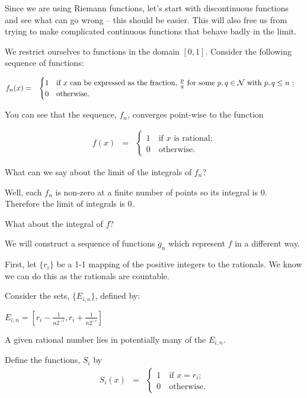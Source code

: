 \documentclass{article}
\begin{document}
Since we are using Riemann functions, 
let's start with discontinuous functions 
and see what can go wrong -- this should be easier. This will also free us from 
trying to make complicated continuous functions that behave badly in the limit.

We restrict ourselves to functions in the domain $[0, 1]$.
Consider the following sequence of functions: 

\begin{eqnarray}
	f_n(x) & = & \begin{cases}  1 \quad \text{if $x$ can be expressed as the fraction, $\frac{p}{q}$ for some $p, q \in {\cal N}$ with $p, q \le n$ ;} \\ 
	  			        		0 \quad \text{otherwise.} 
			   	 \end{cases}
\end{eqnarray}

You can see that the sequence, $f_n$, converges point-wise to the function 

\begin{eqnarray}
	f(x) & = & \begin{cases} 1 \quad \text{if $x$ is rational;} \\ 
			                 0 \quad \text{otherwise.} 
			   \end{cases}
\end{eqnarray}

What can we say about the limit of the integrals of $f_n$?

Well, each $f_n$ is non-zero at a finite number of points so its integral is $0$.
Therefore the limit of integrals is $0$.

What about the integral of $f$?

We will construct a sequence of functions $g_n$ which represent $f$ in a different way.

First, let $\{r_i\}$ be a 1-1 mapping of the positive integers to the rationals.
We know we can do this as the rationals are countable. 

Consider the sets, $\{E_{i,n}\}$, defined by:

$E_{i,n} = \left[r_i - \frac{1}{n 2^{-i}}, r_i + \frac{1}{n 2^{-i}}\right]$

A given rational number lies in potentially many of the $E_{i,n}$.

Define the functions, $S_i$ by
\begin{eqnarray}
	S_{i}(x) & = & \begin{cases} 1 \quad \text{if $x = r_i$}; \\ 
	 							  0 \quad \text{otherwise.} 
					\end{cases}
\end{eqnarray}
\end{document}
